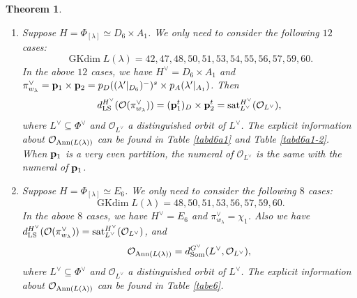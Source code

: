 \documentclass[reqno,12pt]{amsart}
\numberwithin{equation}{section}
\theoremstyle{plain}
\newtheorem{Thm}{Theorem}[section]
\theoremstyle{definition}
\newcommand{\lam}{\lambda}
\renewcommand{\subset}{\subseteq}
\newcommand{\gkd}{\operatorname{GKdim}}
\begin{document}
\begin{Thm}
\begin{enumerate}
\item Suppose $H=\Phi_{[\lam]}\simeq D_6\times A_1$. 
We only need to consider the following $12$ cases:
$$\gkd L(\lam)=42,47,48,50,51,53,54,55,56,57,59,60.$$
In the above $12$ cases, we have $H^{\vee}=D_6\times A_1$ and   
$\pi^{\vee}_{w_{\lam}}={\bf p}_{1}\times {\bf p}_{2}=p_{D}((\lam'|_{D_6})^-)^s\times p_{A}(\lam'|_{A_1})$. Then 
$$d_{\rm LS}^{H^\vee} (\mathcal{O}(\pi_{w_{\lam}}^\vee))=({\bf p}_{1}^t)_D \times {\bf p}^t_{2} = {\rm sat}_{L^\vee}^{H^\vee} (\mathcal{O}_{L^\vee}),$$
where $L^\vee \subset \Phi^\vee$ and $\mathcal{O}_{L^\vee}$ a distinguished orbit of $L^\vee$. The explicit information about $\mathcal{O}_{{\rm Ann}(L(\lambda))}$ can be found in Table \ref{tabd6a1} and Table \ref{tabd6a1-2}. When ${\bf p}_{1}$ is a very even partition, the numeral of $\mathcal{O}_{L^{\vee}}$ is the same with the numeral of ${\bf p}_{1}$.

\item Suppose $H=\Phi_{[\lam]}\simeq E_6$. We only need to consider the following $8$ cases:
$$\gkd L(\lam)=48,50,51,53,56,57,59,60.$$
In the above $8$ cases, we have $H^{\vee}=E_6$ and
$\pi^{\vee}_{w_{\lam}}={\chi}_{1}$. %
Also we have
$d_{\rm LS}^{H^\vee}(\mathcal{O}(\pi_{w_\lambda}^\vee)) = {\rm sat}_{L^\vee}^{H^\vee}(\mathcal{O}_{L^\vee})$,
and $$\mathcal{O}_{{\rm Ann}(L(\lambda))} = d_{\rm Som}^{G^\vee}(L^{\vee}, \mathcal{O}_{L^\vee}),$$
where $L^\vee \subset \Phi^\vee$ and $\mathcal{O}_{L^\vee}$ a distinguished orbit of $L^\vee$. The explicit information about $\mathcal{O}_{{\rm Ann}(L(\lambda))}$ can be found in Table \ref{tabe6}.





















\end{enumerate}
\end{Thm}
\end{document}
